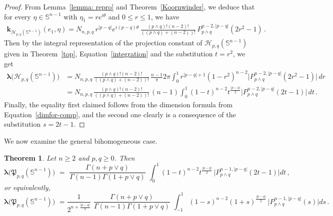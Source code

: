 \documentclass[12pt]{amsart}
\numberwithin{subsection}{section}
\newtheorem{theorem}{Theorem}[section]
\theoremstyle{definition}
\theoremstyle{remark}
\begin{document}
\begin{proof}
From  Lemma~\ref{lemma: repro} and Theorem~\ref{Koornwinder}, we deduce that  for every  $\eta \in \mathbb{S}^{n-1}$
with  $\eta_1 = r e^{i \theta}$ and $0\leq r \leq 1$, we have
\begin{align*}
\mathbf{k}_{\mathcal{H}_{p,q}(\mathbb{S}^{n-1})}(e_1, \eta)
= N_{n,p,q}\,r^{|p-q|}  e^{i(p-q)\theta}
\,
\frac{(p\wedge q)!(n-2)!}{((p\wedge q) + (n-2))!}
\,
P_{p\wedge q}^{n-2,|p-q|}(2r^2 -1)\,.
\end{align*}
Then by  the integral representation of  the projection constant of $\mathcal{H}_{p,q}(\mathbb{S}^{n-1})$ given in
Theorem~\ref{top}, Equation~\eqref{integration} and the substitution  $t=r^2 $, we get
\begin{align*}
\boldsymbol{\lambda}\big(\mathcal{H}_{p,q}(\mathbb{S}^{n-1})\big)
&=
N_{n,p,q}\,
\frac{(p\wedge q)!(n-2)!}{((p\wedge q) + (n-2))!}
\,
\frac{n-1}{\pi} 2 \pi  \int_{0}^{1} r^{|p-q|+1}  (1-r^2)^{n-2}
\big| P_{p\wedge q}^{n-2,|p-q|}(2r^2 -1) \big| \,dr
\\&
=
N_{n,p,q}\,
\frac{(p\wedge q)!(n-2)!}{((p\wedge q) + (n-2))!}
\,
(n-1)  \int_{0}^{1}   (1-t)^{n-2} t^{\frac{|p-q|}{2}}
\big| P_{p\wedge q}^{n-2,|p-q|}(2t -1) \big| \,dt\,.
\end{align*}
Finally,  the  equality first claimed follows from the dimension formula from Equation~\eqref{dimfor-comp},
and the second one clearly is a consequence of the substitution  $s = 2t-1 $.
\end{proof}

We now examine the general bihomogeneous case.

\begin{theorem} \label{bi-end}
Let $n \geq 2 $ and $p,q \geq 0 $. Then
 \begin{equation*}
  \boldsymbol{\lambda}\big(\mathfrak{P}_{p,q}(\mathbb{S}^{n-1})\big)
  \,\,= \,\, \frac{\Gamma(n + p \vee q )}{\Gamma(n-1)\Gamma( 1 + p \vee q )}\,\, \int_{0}^{1} (1-t)^{n-2} t^{\frac{|p-q|}{2}} \,\big| P_{p\wedge q}^{n-1,|p-q|}(2t -1)\big| dt\,,
\end{equation*}
or equivalently,
\begin{equation*}
  \boldsymbol{\lambda}\big(\mathfrak{P}_{p,q}(\mathbb{S}^{n-1})\big)
 \,\, = \frac{1}{2^{n + \frac{|p-q|}{2}}}\,\,  \frac{\Gamma(n + p \vee q )}{\Gamma(n-1)\Gamma( 1 + p \vee q )}\,\, \int_{-1}^{1} (1-s)^{n-2} (1+s)^{\frac{|p-q|}{2}} \,\big| P_{p\wedge q}^{n-1,|p-q|}(s)\big| ds\,.
\end{equation*}
  \end{theorem}
\end{document}
